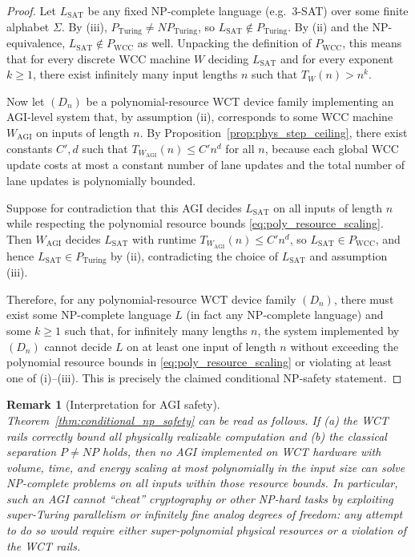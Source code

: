 \documentclass[12pt]{article}
\newtheorem{remark}[theorem]{Remark}
\begin{document}
\begin{proof}
Let $L_{\mathrm{SAT}}$ be any fixed NP-complete language (e.g.\ 3-SAT) over
some finite alphabet $\Sigma$. By (iii), $P_{\mathrm{Turing}} \neq
NP_{\mathrm{Turing}}$, so $L_{\mathrm{SAT}} \notin P_{\mathrm{Turing}}$. By
(ii) and the NP-equivalence, $L_{\mathrm{SAT}} \notin P_{\mathrm{WCC}}$ as
well. Unpacking the definition of $P_{\mathrm{WCC}}$, this means that for
every discrete WCC machine $W$ deciding $L_{\mathrm{SAT}}$ and for every
exponent $k \ge 1$, there exist infinitely many input lengths $n$ such that
$T_W(n) > n^{k}$.

Now let $(D_n)$ be a polynomial-resource WCT device family implementing an
AGI-level system that, by assumption (ii), corresponds to some WCC machine
$W_{\mathrm{AGI}}$ on inputs of length $n$. By
Proposition~\ref{prop:phys_step_ceiling}, there exist constants $C',d$ such
that $T_{W_{\mathrm{AGI}}}(n) \le C' n^{d}$ for all $n$, because each global
WCC update costs at most a constant number of lane updates and the total
number of lane updates is polynomially bounded.

Suppose for contradiction that this AGI decides $L_{\mathrm{SAT}}$ on all
inputs of length $n$ while respecting the polynomial resource bounds
\eqref{eq:poly_resource_scaling}. Then $W_{\mathrm{AGI}}$ decides
$L_{\mathrm{SAT}}$ with runtime $T_{W_{\mathrm{AGI}}}(n) \le C' n^{d}$, so
$L_{\mathrm{SAT}} \in P_{\mathrm{WCC}}$, and hence $L_{\mathrm{SAT}} \in
P_{\mathrm{Turing}}$ by (ii), contradicting the choice of
$L_{\mathrm{SAT}}$ and assumption (iii).

Therefore, for any polynomial-resource WCT device family $(D_n)$, there
must exist some NP-complete language $L$ (in fact any NP-complete language)
and some $k \ge 1$ such that, for infinitely many lengths $n$, the system
implemented by $(D_n)$ cannot decide $L$ on at least one input of length $n$
without exceeding the polynomial resource bounds in
\eqref{eq:poly_resource_scaling} or violating at least one of (i)--(iii).
This is precisely the claimed conditional NP-safety statement.
\end{proof}

\begin{remark}[Interpretation for AGI safety]
\label{rem:agi_safety_interpretation}
Theorem~\ref{thm:conditional_np_safety} can be read as follows. If
\emph{(a)} the WCT rails correctly bound all physically realizable
computation and \emph{(b)} the classical separation $P \neq NP$ holds, then
no AGI implemented on WCT hardware with volume, time, and energy scaling at
most polynomially in the input size can solve NP-complete problems on all
inputs within those resource bounds. In particular, such an AGI cannot
``cheat'' cryptography or other NP-hard tasks by exploiting super-Turing
parallelism or infinitely fine analog degrees of freedom: any attempt to do
so would require either super-polynomial physical resources or a violation
of the WCT rails.
\end{remark}
\end{document}
